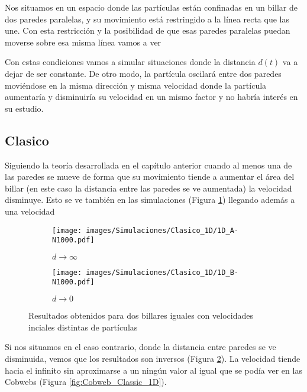 Nos situamos en un espacio donde las partículas están confinadas en un billar de dos paredes paralelas, y su movimiento está restringido a la línea recta que las une. Con esta restricción y la posibilidad de que esas paredes paralelas puedan moverse sobre esa misma línea vamos a ver 

\vspace{3mm}

Con estas condiciones vamos a simular situaciones donde la distancia \( d(t) \) va a dejar de ser constante. De otro modo, la partícula oscilará entre dos paredes moviéndose en la misma dirección y misma velocidad donde la partícula aumentaría y disminuiría su velocidad en un mismo factor y no habría interés en su estudio.

\subsection{Clasico}

Siguiendo la teoría desarrollada en el capítulo anterior cuando al menos una de las paredes se mueve de forma que su movimiento tiende a aumentar el área del billar (en este caso la distancia entre las paredes se ve aumentada) la velocidad disminuye. Esto se ve también en las simulaciones (Figura \ref{fig:clasico_1D_A}) llegando además a una velocidad 

\begin{figure}[!h]
    \begin{subfigure}[b]{0.5\textwidth}
        \centering
        \texttt{[image: images/Simulaciones/Clasico\_1D/1D\_A-N1000.pdf]}
        \caption{\( d \rightarrow \infty \)}
        \label{fig:clasico_1D_A}
    \end{subfigure}
    \hfill
    \begin{subfigure}[b]{0.5\textwidth}
        \centering
        \texttt{[image: images/Simulaciones/Clasico\_1D/1D\_B-N1000.pdf]}
        \caption{\( d \rightarrow 0 \)}
        \label{fig:clasico_1D_B}
    \end{subfigure}
    \caption{Resultados obtenidos para dos billares iguales con velocidades inciales distintas de partículas}
    \label{fig:clasico_1D}
\end{figure}

Si nos situamos en el caso contrario, donde la distancia entre paredes se ve disminuida, vemos que los resultados son inversos (Figura \ref{fig:clasico_1D_B}). La velocidad tiende hacia el infinito sin aproximarse a un ningún valor al igual que se podía ver en las Cobwebs (Figura \ref{fig:Cobweb_Classic_1D}). 

